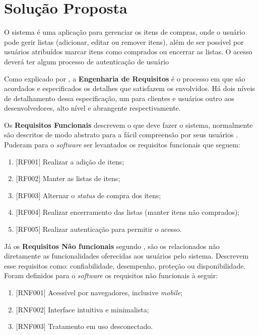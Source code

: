 \documentclass[12pt]{article}
\begin{document}
\section{Solução Proposta}

O sistema é uma aplicação para gerenciar os itens de compras, onde o usuário pode gerir listas (adicionar, editar ou remover itens), além de ser possível por usuários atribuídos marcar itens como comprados ou encerrar as listas. O acesso deverá ter algum processo de autenticação de usuário

Como explicado por \cite{sommerville2011}, a \textbf{Engenharia de Requisitos} é o processo em que são acordados e especificados os detalhes que satisfazem os envolvidos. Há dois níveis de detalhamento dessa especificação, um para clientes e usuários outro aos desenvolvedores, alto nível e abrangente respectivamente.

Os \textbf{Requisitos Funcionais} descrevem o que deve fazer o sistema, normalmente são descritos de modo abstrato para a fácil compreensão por seus usuários \cite{sommerville2011}. Puderam para o \textit{software} ser levantados os requisitos funcionais que seguem:
\begin{enumerate}
\item $[$RF001$]$ Realizar a adição de itens;
\item $[$RF002$]$ Manter as listas de itens;
\item $[$RF003$]$ Alternar o \textit{status} de compra dos itens;
\item $[$RF004$]$ Realizar encerramento das listas (manter itens não comprados);
\item $[$RF005$]$ Realizar autenticação para permitir o acesso.
\end{enumerate}

Já os \textbf{Requisitos Não funcionais} segundo \cite{sommerville2011}, são os relacionados não diretamente as funcionalidades oferecidas aos usuários pelo sistema. Descrevem esse requisitos como: confiabilidade, desempenho, proteção ou disponibilidade.
Foram definidos para o \textit{software}  os requisitos não funcionais à seguir:
\begin{enumerate}
\item $[$RNF001$]$ Acessível por navegadores, inclusive \textit{mobile};
\item $[$RNF002$]$ Interface intuitiva e minimalista;
\item $[$RNF003$]$ Tratamento em uso desconectado.
\end{enumerate}
\end{document}

